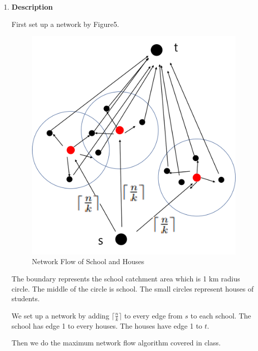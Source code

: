 \documentclass[a4paper,11pt]{article}
\begin{document}
\begin{enumerate}
\begin{enumerate}
\end{enumerate}
\pagebreak
\item{\bf Description}

First set up a network  by Figure5.

\begin{figure}[hbt]
\centering
\includegraphics[scale=0.4]{figure5.png}
\caption{Network Flow of School and Houses}
\end{figure}

The boundary represents the school catchment area which is 1 km radius circle. The middle of the circle is school. The small circles represent houses of students.

We set up a network by adding $\lceil \frac{n}{k}\rceil$ to every edge from $s$ to each school. The school has edge 1 to every houses. 
The houses have edge 1 to $t$.

Then we do the maximum network flow algorithm covered in class.


\end{enumerate}
\end{document}
